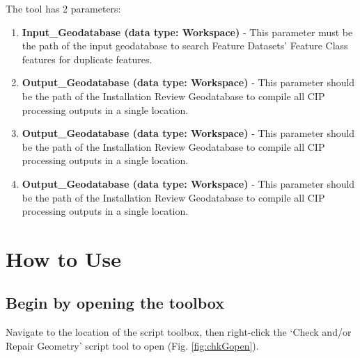 \documentclass[openany]{book}
\providecommand{\tightlist}{%
  \setlength{\itemsep}{0pt}\setlength{\parskip}{0pt}}
\theoremstyle{definition}
\theoremstyle{definition}
\theoremstyle{definition}
\theoremstyle{remark}
\begin{document}
The tool has 2 parameters:

\begin{enumerate}
\def\labelenumi{\arabic{enumi}.}
\tightlist
\item
  \textbf{Input\_Geodatabase (data type: Workspace)} - This parameter
  must be the path of the input geodatabase to search Feature Datasets'
  Feature Class features for duplicate features.
\item
  \textbf{Output\_Geodatabase (data type: Workspace)} - This parameter
  should be the path of the Installation Review Geodatabase to compile
  all CIP processing outputs in a single location.
\item
  \textbf{Output\_Geodatabase (data type: Workspace)} - This parameter
  should be the path of the Installation Review Geodatabase to compile
  all CIP processing outputs in a single location.
\item
  \textbf{Output\_Geodatabase (data type: Workspace)} - This parameter
  should be the path of the Installation Review Geodatabase to compile
  all CIP processing outputs in a single location.
\end{enumerate}

\section{How to Use}\label{how-to-use-5}

\subsection{Begin by opening the
toolbox}\label{begin-by-opening-the-toolbox-5}

Navigate to the location of the script toolbox, then right-click the
`Check and/or Repair Geometry' script tool to open (Fig.
\ref{fig:chkGopen}).
\end{document}
